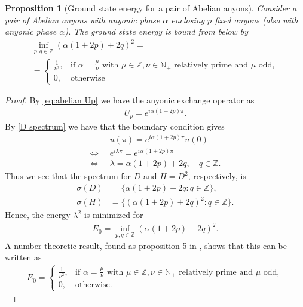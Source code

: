 \documentclass[a4paper,10pt,oneside]{book}
\theoremstyle{plain}
\newtheorem{proposition}[theorem]{Proposition}
\theoremstyle{definition}
\theoremstyle{remark}
\begin{document}
\begin{proposition}[Ground state energy for a pair of Abelian anyons]
  Consider a pair of Abelian anyons with anyonic phase $\alpha$ enclosing $p$ fixed anyons (also with anyonic phase $\alpha$).
  The ground state energy is bound from below by
    \begin{gather*}
      \inf_{p,q\in\mathbb{Z}} \left(\alpha(1+2p)+2q\right)^2 =\\
      = \begin{cases}
        \frac{1}{\nu^2}, & \text{if $\alpha = \frac{\mu}{\nu}$ with $\mu \in \mathbb{Z}, \nu \in \mathbb{N}_+$ relatively prime and $\mu$ odd}, \\
        0, & \text{otherwise}
      \end{cases}
    \end{gather*}
\end{proposition}

\begin{proof}
  By \cref{eq:abelian Up} we have the anyonic exchange operator as
  \begin{align*}
    U_p = e^{i\alpha(1+2p)π}.
  \end{align*}
  By \cref{D spectrum} we have that the boundary condition gives
  \begin{align*}
    &u(π) = e^{i\alpha(1+2p)π} u(0) \\
    \iff\;\; &e^{iλ π} = e^{i\alpha(1+2p)π} \\
    \iff\;\; &λ = \alpha(1+2p) + 2q, \quad q \in \mathbb{Z}.
  \end{align*}
  Thus we see that the spectrum for $D$ and $H = D^2$, respectively, is
  \begin{align*}
    σ(D) &= \{ \alpha(1+2p) + 2q : q \in \mathbb{Z}\}, \\
    σ(H) &= \{ (\alpha(1+2p) + 2q)^2 : q \in \mathbb{Z}\}.
  \end{align*}
  Hence, the energy $λ^2$ is minimized for
  \begin{align*}
    E_0 = \inf_{p,q\in\mathbb{Z}} (\alpha(1+2p)+2q)^2.
  \end{align*}
  A number-theoretic result, found as proposition 5 in \cite{lundholm-solovej}, shows that this can be written as
  \begin{align*}
    E_0 =
    \begin{cases}
      \frac{1}{\nu^2}, & \text{if $\alpha = \frac{\mu}{\nu}$ with $\mu \in \mathbb{Z}, \nu \in \mathbb{N}_+$ relatively prime and $\mu$ odd}, \\
      0, & \text{otherwise}.
    \end{cases}
  \end{align*}
\end{proof}
\end{document}
